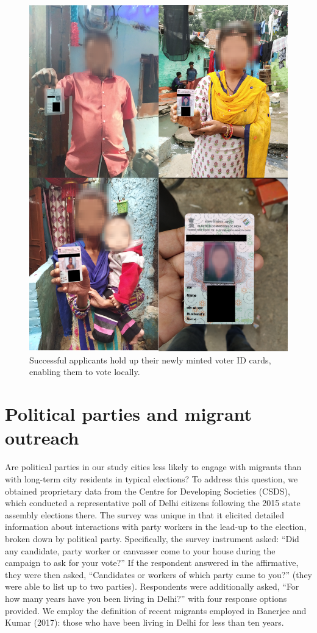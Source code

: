 \documentclass[
  11.5pt,
]{article}
\begin{document}
\begin{figure}
\includegraphics[width=1\linewidth]{pic-voter-id} \caption{Successful applicants hold up their newly minted voter ID cards, enabling them to vote locally.}\label{fig:unnamed-chunk-31}
\end{figure}

\section{Political parties and migrant outreach}

Are political parties in our study cities less likely to engage with
migrants than with long-term city residents in typical elections? To
address this question, we obtained proprietary data from the Centre for
Developing Societies (CSDS), which conducted a representative poll of
Delhi citizens following the 2015 state assembly elections there. The
survey was unique in that it elicited detailed information about
interactions with party workers in the lead-up to the election, broken
down by political party. Specifically, the survey instrument asked:
``Did any candidate, party worker or canvasser come to your house during
the campaign to ask for your vote?'' If the respondent answered in the
affirmative, they were then asked, ``Candidates or workers of which
party came to you?'' (they were able to list up to two parties).
Respondents were additionally asked, ``For how many years have you been
living in Delhi?'' with four response options provided. We employ the
definition of recent migrants employed in Banerjee and Kumar (2017):
those who have been living in Delhi for less than ten years.
\end{document}
